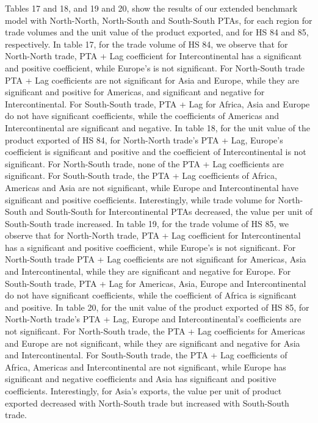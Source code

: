 \documentclass[12pt]{article}%
\begin{document}
Tables 17 and 18, and 19 and 20, show the results of our extended
benchmark model with North-North, North-South and South-South PTAs, for
each region for trade volumes and the unit value of the product
exported, and for HS 84 and 85, respectively. In table 17, for the trade
volume of HS 84, we observe that for North-North trade, PTA + Lag
coefficient for Intercontinental has a significant and positive
coefficient, while Europe's is not significant. For North-South trade
PTA + Lag coefficients are not significant for Asia and Europe, while
they are significant and positive for Americas, and significant and
negative for Intercontinental. For South-South trade, PTA + Lag for
Africa, Asia and Europe do not have significant coefficients, while the
coefficients of Americas and Intercontinental are significant and
negative. In table 18, for the unit value of the product exported of HS
84, for North-North trade's PTA + Lag, Europe's coefficient is
significant and positive and the coefficient of Intercontinental is not
significant. For North-South trade, none of the PTA + Lag coefficients
are significant. For South-South trade, the PTA + Lag coefficients of
Africa, Americas and Asia are not significant, while Europe and
Intercontinental have significant and positive coefficients.
Interestingly, while trade volume for North-South and South-South for
Intercontinental PTAs decreased, the value per unit of South-South trade
increased. In table 19, for the trade volume of HS 85, we observe that
for North-North trade, PTA + Lag coefficient for Intercontinental has a
significant and positive coefficient, while Europe's is not significant.
For North-South trade PTA + Lag coefficients are not significant for
Americas, Asia and Intercontinental, while they are significant and
negative for Europe. For South-South trade, PTA + Lag for Americas,
Asia, Europe and Intercontinental do not have significant coefficients,
while the coefficient of Africa is significant and positive. In table
20, for the unit value of the product exported of HS 85, for North-North
trade's PTA + Lag, Europe and Intercontinental's coefficients are not
significant. For North-South trade, the PTA + Lag coefficients for
Americas and Europe are not significant, while they are significant and
negative for Asia and Intercontinental. For South-South trade, the PTA +
Lag coefficients of Africa, Americas and Intercontinental are not
significant, while Europe has significant and negative coefficients and
Asia has significant and positive coefficients. Interestingly, for
Asia's exports, the value per unit of product exported decreased with
North-South trade but increased with South-South trade.
\end{document}
